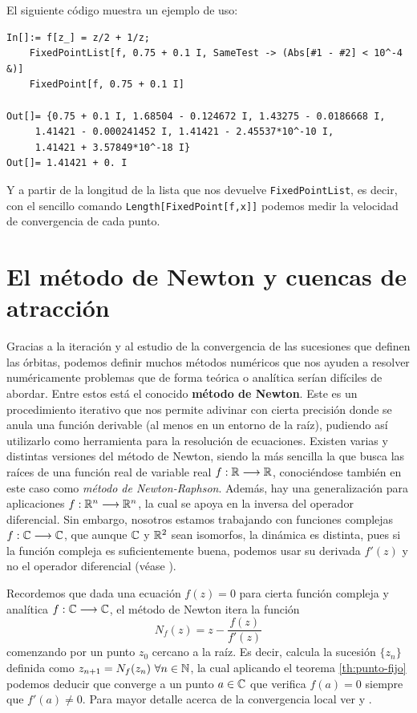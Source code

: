 El siguiente código muestra un ejemplo de uso:

\begin{verbatim}
In[]:= f[z_] = z/2 + 1/z;
    FixedPointList[f, 0.75 + 0.1 I, SameTest -> (Abs[#1 - #2] < 10^-4 &)]
    FixedPoint[f, 0.75 + 0.1 I]
    
Out[]= {0.75 + 0.1 I, 1.68504 - 0.124672 I, 1.43275 - 0.0186668 I, 
     1.41421 - 0.000241452 I, 1.41421 - 2.45537*10^-10 I, 
     1.41421 + 3.57849*10^-18 I}
Out[]= 1.41421 + 0. I
\end{verbatim}

Y a partir de la longitud de la lista que nos devuelve \verb|FixedPointList|, es decir, con el sencillo comando \verb|Length[FixedPoint[f,x]]| podemos medir la velocidad de convergencia de cada punto.

\section{El método de Newton y cuencas de atracción}

Gracias a la iteración y al estudio de la convergencia de las sucesiones que definen las órbitas, podemos definir muchos métodos numéricos que nos ayuden a resolver numéricamente problemas que de forma teórica o analítica serían difíciles de abordar. Entre estos está el conocido \textbf{método de Newton}. Este es un procedimiento iterativo que nos permite adivinar con cierta precisión donde se anula una función derivable (al menos en un entorno de la raíz), pudiendo así utilizarlo como herramienta para la resolución de ecuaciones. Existen varias y distintas versiones del método de Newton, siendo la más sencilla la que busca las raíces de una función real de variable real $f:\mathbb{R}\longrightarrow\mathbb{R}$, conociéndose también en este caso como \textit{método de Newton-Raphson}. Además, hay una generalización para aplicaciones $f:\mathbb{R}^n\longrightarrow\mathbb{R}^n$, la cual se apoya en la inversa del operador diferencial. Sin embargo, nosotros estamos trabajando con funciones complejas $f:\mathbb{C}\longrightarrow\mathbb{C}$, que aunque $\mathbb{C}$ y $\mathbb{R}^2$ sean isomorfos, la dinámica es distinta, pues si la función compleja es suficientemente buena, podemos usar su derivada $f'(z)$ y no el operador diferencial (véase \cite{Dubeau-Gnang}). 

Recordemos que dada una ecuación $f(z)=0$ para cierta función compleja y analítica $f:\mathbb{C}\longrightarrow\mathbb{C}$, el método de Newton itera la función
\begin{equation}
    \label{eq:metodo-Newton}
    N_f(z)=z-\frac{f(z)}{f'(z)}
\end{equation} 
comenzando por un punto $z_0$ cercano a la raíz. Es decir, calcula la sucesión $\{z_n\}$ definida como $z_{n+1}=N_f(z_n) \ \forall n\in\mathbb{N}$, la cual aplicando el teorema \ref{th:punto-fijo} podemos deducir que converge a un punto $a\in\mathbb{C}$ que verifica $f(a)=0$ siempre que $f'(a)\not= 0$. Para mayor detalle acerca de la convergencia local ver \cite[Capítulo 7]{Ostrowski} y \cite[Sección 5.4]{Atkinson}.

